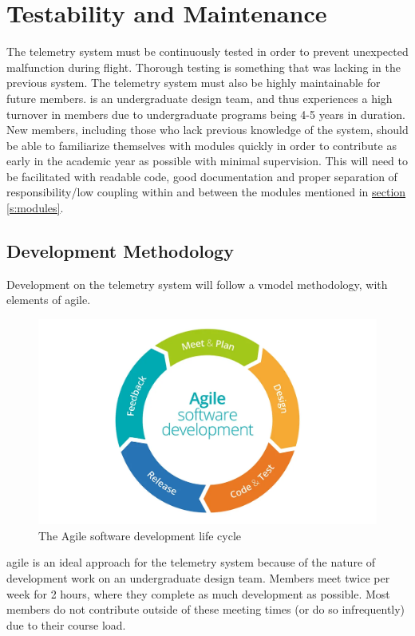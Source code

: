 \section{Testability and Maintenance}

The  telemetry system must be continuously tested in order to prevent unexpected malfunction
during flight. Thorough testing is something that was lacking in the previous system. The telemetry system must also be
highly maintainable for future members.  is an undergraduate design team, and thus experiences a
high turnover in members due to undergraduate programs being 4-5 years in duration. New members, including those who
lack previous knowledge of the system, should be able to familiarize themselves with modules quickly in order to
contribute as early in the academic year as possible with minimal supervision. This will need to be facilitated with
readable code, good documentation and proper separation of responsibility/low coupling within and between the modules
mentioned in \hyperref[s:modules]{section \ref{s:modules}}.

\subsection{Development Methodology}

Development on the telemetry system will follow a \gls{vmodel} methodology, with elements of \gls{agile}.

\begin{figure}[H]
    \centerline{\includegraphics[width=0.7\linewidth]{assets/agile.png}}
    \caption{The Agile software development life cycle \cite{agile}}
\end{figure}

\Gls{agile} is an ideal approach for the  telemetry system because of the nature of development work
on an undergraduate design team. Members meet twice per week for 2 hours, where they complete as much development as
possible. Most members do not contribute outside of these meeting times (or do so infrequently) due to their course
load.

